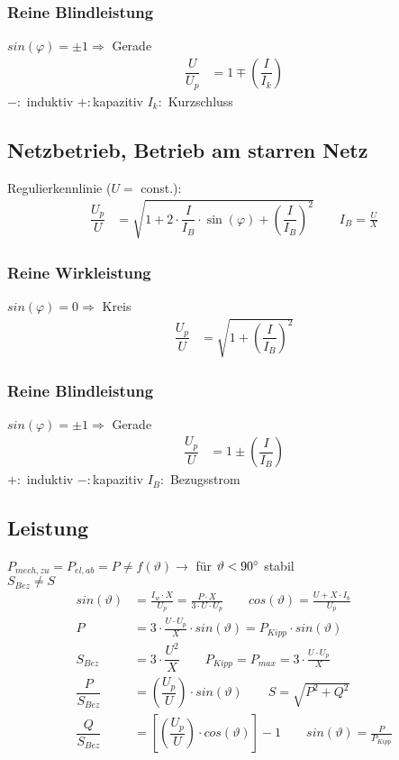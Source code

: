 \subsubsection{Reine Blindleistung}
$    sin(\varphi) = \pm1 \Rightarrow$ Gerade
\begin{align*}
    \dfrac{U}{U_p} &= 1 \mp \left(\dfrac{I}{I_k}\right)
\end{align*}
$- :$ induktiv \qquad $+ :$kapazitiv \qquad
$I_k :$ Kurzschluss

\subsection{Netzbetrieb, Betrieb am starren Netz}
Regulierkennlinie ($U=$ const.):
\begin{align*}
    \dfrac{U_p}{U} &=  \sqrt{1+2\cdot \dfrac{I}{I_B} \cdot \sin(\varphi) + \left( \dfrac{I}{I_B}\right)^2} \qquad I_B = \frac{U}{X}
\end{align*}
\subsubsection{Reine Wirkleistung}
$sin(\varphi) = 0 \Rightarrow$ Kreis
\begin{align*}
    \dfrac{U_p}{U} &= \sqrt{1+ \left(\dfrac{I}{I_B}\right)^2}
\end{align*}

\subsubsection{Reine Blindleistung}
$    sin(\varphi) = \pm1 \Rightarrow$ Gerade
\begin{align*}
    \dfrac{U_p}{U} &= 1 \pm \left(\dfrac{I}{I_B}\right)
\end{align*}
$+ :$ induktiv \qquad $- :$kapazitiv \qquad $I_B :$ Bezugsstrom

\subsection{Leistung}
$P_{mech,zu} = P_{el,ab} = P \neq f(\vartheta) \rightarrow$ für $\vartheta < 90\degree$ stabil\\
$S_{Bez} \neq S$
\begin{align*}
    sin(\vartheta) &= \frac{I_w\cdot X}{U_p} = \frac{P\cdot X}{3\cdot U \cdot U_p}  \qquad cos(\vartheta) = \frac{U+X \cdot I_b}{U_p}\\
    P &= 3 \cdot \frac{U\cdot U_p}{X} \cdot sin(\vartheta) = P_{Kipp} \cdot sin(\vartheta)\\
    S_{Bez} &= 3 \cdot \dfrac{U^2}{X} \qquad P_{Kipp} = P_{max} = 3\cdot \frac{U \cdot U_p}{X}\\
    \dfrac{P}{S_{Bez}} &= \left(\dfrac{U_p}{U}\right) \cdot sin(\vartheta) \qquad S = \sqrt{P^2+Q^2}\\
    \dfrac{Q}{S_{Bez}} &= \left[\left(\dfrac{U_p}{U}\right) \cdot cos(\vartheta)\right] -1 \qquad sin{(\vartheta)}=\frac{P}{P_{Kipp}}\\
\end{align*}

